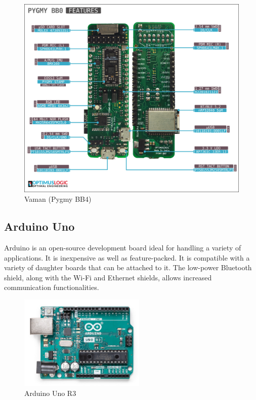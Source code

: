 \begin{figure}[h!]
\centering
\includegraphics[width=14cm]{./Figures/Vaman.png}
\caption{Vaman (Pygmy BB4)}
\label{vaman}
\end{figure}

\subsection{Arduino Uno}  

\par Arduino is an open-source development board ideal for handling a variety of applications. It is inexpensive as well as feature-packed. It is compatible with a variety of daughter boards that can be attached to it.  The low-power Bluetooth shield, along with the Wi-Fi and Ethernet shields, allows increased communication functionalities. 

\begin{figure}[h!]
\centering
\includegraphics[width=6cm]{./Figures/Arduino_Uno.jpg}
\caption{Arduino Uno R3}
\label{Arduino_Uno_R3}
\end{figure}

